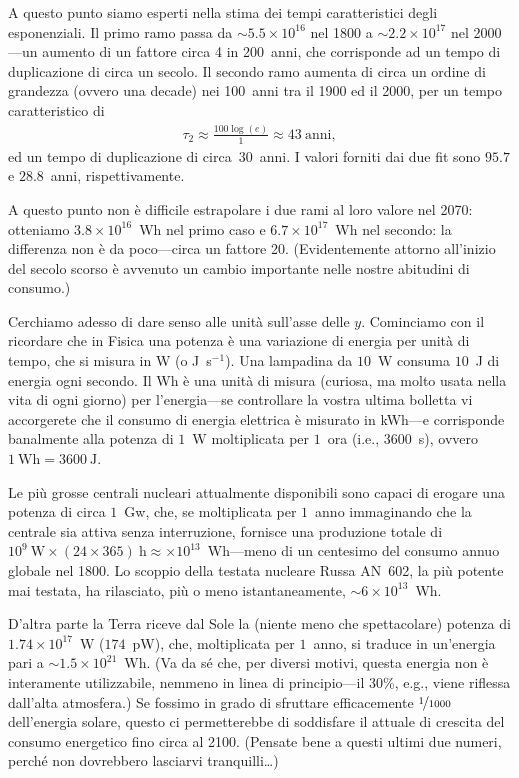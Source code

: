 A questo punto siamo esperti nella stima dei tempi caratteristici degli esponenziali.
Il primo ramo passa da $\sim 5.5 \times 10^{16}$ nel 1800 a $\sim 2.2 \times 10^{17}$
nel 2000---un aumento di un fattore circa 4 in 200~anni, che corrisponde ad un tempo
di duplicazione di circa un secolo. Il secondo ramo aumenta di circa un ordine di
grandezza (ovvero una decade) nei 100~anni tra il 1900 ed il 2000, per un tempo caratteristico di
\begin{align*}
  \tau_2 \approx \frac{100 \log(e)}{1} \approx 43~\text{anni},
\end{align*}
ed un tempo di duplicazione di circa~$30$~anni. I valori forniti dai due fit sono
$95.7$ e $28.8$~anni, rispettivamente.

A questo punto non è difficile estrapolare i due rami al loro valore nel
2070: otteniamo $3.8 \times 10^{16}$~Wh nel primo caso e $6.7 \times 10^{17}$~Wh nel
secondo: la differenza non è da poco---circa un fattore 20. (Evidentemente attorno
all'inizio del secolo scorso è avvenuto un cambio importante nelle nostre abitudini
di consumo.)

Cerchiamo adesso di dare senso alle unità sull'asse delle $y$. Cominciamo con il
ricordare che in Fisica una potenza è una variazione di energia per unità di
tempo, che si misura in W (o J~s$^{-1}$). Una lampadina da $10$~W consuma $10$~J
di energia ogni secondo. Il Wh è una unità di misura (curiosa, ma molto usata
nella vita di ogni giorno) per l'energia---se controllare la vostra ultima bolletta
vi accorgerete che il consumo di energia elettrica è misurato in kWh---e corrisponde
banalmente alla potenza di $1$~W moltiplicata per $1$~ora (i.e., $3600$~s), ovvero
$1~\text{Wh} = 3600~\text{J}$.

Le più grosse centrali nucleari attualmente disponibili sono capaci di erogare
una potenza di circa $1$~Gw, che, se moltiplicata per $1$~anno immaginando che
la centrale sia attiva senza interruzione, fornisce una produzione totale di
$10^9~\text{W} \times (24 \times 365)~\text{h} \approx \times 10^{13}$~Wh---meno
di un centesimo del consumo annuo globale nel 1800. Lo scoppio della testata
nucleare Russa AN~602, la più potente mai testata, ha rilasciato, più o meno
istantaneamente, $\sim 6 \times 10^{13}$~Wh.

D'altra parte la Terra riceve dal Sole la (niente meno che spettacolare) potenza di
$1.74 \times 10^{17}$~W ($174$~pW), che, moltiplicata per $1$~anno, si traduce
in un'energia pari a $\sim 1.5 \times 10^{21}$~Wh. (Va da sé che, per diversi
motivi, questa energia non è interamente utilizzabile, nemmeno in linea di
principio---il 30\%, e.g., viene riflessa dall'alta atmosfera.) Se fossimo in grado
di sfruttare efficacemente $\nicefrac{1}{1000}$ dell'energia solare, questo ci
permetterebbe di soddisfare il  attuale di crescita del consumo
energetico fino circa al 2100. (Pensate bene a questi ultimi due numeri, perché
non dovrebbero lasciarvi tranquilli\ldots)


